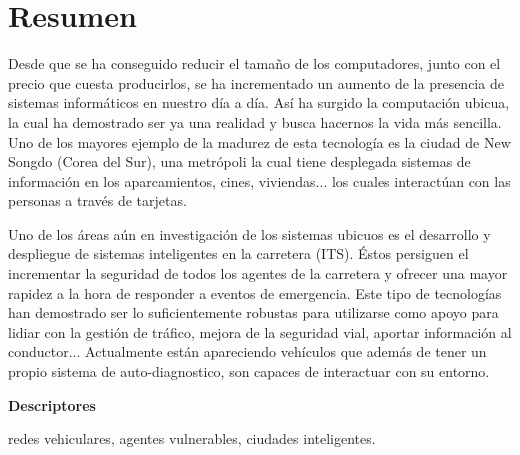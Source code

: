 \chapter*{Resumen}
Desde que se ha conseguido reducir el tamaño de los computadores, junto con el precio que cuesta producirlos, se ha incrementado un aumento de la presencia de sistemas informáticos en nuestro día a día. Así ha surgido la computación ubicua, la cual ha demostrado ser ya una realidad y busca hacernos la vida más sencilla. Uno de los mayores ejemplo de la madurez de esta tecnología es la ciudad de New Songdo (Corea del Sur), una metrópoli la cual tiene desplegada sistemas de información en los aparcamientos, cines, viviendas... los cuales interactúan con las personas a través de tarjetas.

Uno de los áreas aún en investigación de los sistemas ubicuos es el desarrollo y despliegue de sistemas inteligentes en la carretera (ITS). Éstos persiguen el incrementar la seguridad de todos los agentes de la carretera y ofrecer una mayor rapidez a la hora de responder a eventos de emergencia. Este tipo de tecnologías han demostrado ser lo suficientemente robustas para utilizarse como apoyo para lidiar con la gestión de tráfico, mejora de la seguridad vial, aportar información al conductor... Actualmente están apareciendo vehículos que además de tener un propio sistema de auto-diagnostico, son capaces de interactuar con su entorno.

\vspace{2em}

{\Large\bfseries\sectionfont Descriptores}
\vspace{3\medskipamount}

redes vehiculares, agentes vulnerables, ciudades inteligentes.

\cleardoublepage\tableofcontents
\cleardoublepage\listoffigures
\cleardoublepage\listoftables
\cleardoublepage\listoflistings

\mainmatter
\pagestyle{phdthesis}